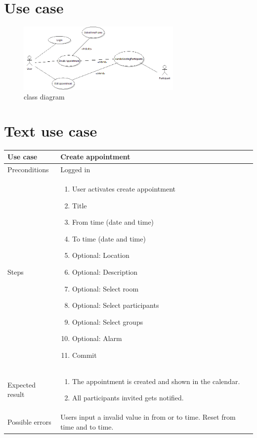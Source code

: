 \documentclass[a4paper, 10pt]{article}
\begin{document}



\section{Use case}
\begin{figure}[h!] 
    \begin{center}  
        \includegraphics[width=8cm]{img/useCase1-4.png}
        \caption{class diagram}
    \label{class}
    \end{center}
\end{figure}


\section{Text use case}
\begin{tabularx}{\textwidth}{ |X|X| }
\hline
\rowcolor{Gray}
Use case &  Create appointment \\ \hline
Preconditions & Logged in \\ \hline
Steps & 
\begin{enumerate}
	\item User activates create appointment
	\item Title
	\item From time (date and time)
	\item To time (date and time)
	\item Optional: Location
	\item Optional: Description
	\item Optional: Select room
	\item Optional: Select participants
	\item Optional: Select groups
	\item Optional: Alarm
	\item Commit
\end{enumerate}\\ \hline
Expected result & 
\begin{enumerate}
	\item The appointment is created and shown in the calendar.
	\item All participants invited gets notified. 
\end{enumerate} \\ \hline
Possible errors & Users input a invalid value in from or to time. Reset from time and to time. \\ \hline


\end{tabularx}
\end{document}
